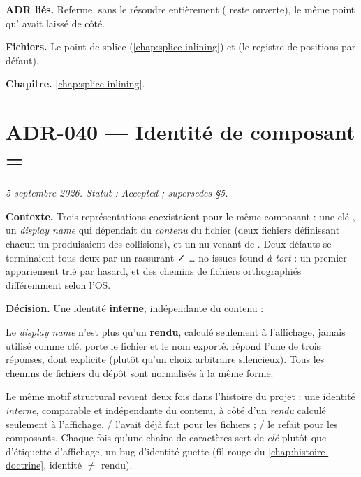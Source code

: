 \textbf{ADR liés.} Referme, sans le résoudre entièrement ( reste
ouverte), le même point qu' avait laissé de côté.

\textbf{Fichiers.} Le point de splice (\cref{chap:splice-inlining}) et
 (le registre de positions par défaut).

\textbf{Chapitre.} \cref{chap:splice-inlining}.

\section{ADR-040 --- Identité de composant = }
\label{adr:40}
\noindent\textit{5 septembre 2026. Statut : Accepted ; supersedes  §5.}

\textbf{Contexte.} Trois représentations coexistaient pour \og le même\fg{}
composant : une clé , un \emph{display name} qui
dépendait du \emph{contenu} du fichier (deux fichiers définissant chacun un
 produisaient des collisions), et un  nu venant de
. Deux défauts se terminaient tous deux par un rassurant
\og ✓ … no issues found\fg{} \emph{à tort} : un premier appariement trié par
hasard, et des chemins de fichiers orthographiés différemment selon l'OS.

\textbf{Décision.} Une identité \textbf{interne}, indépendante du contenu :


Le \emph{display name} n'est plus qu'un \textbf{rendu}, calculé seulement à
l'affichage, jamais utilisé comme clé.  porte le fichier
et le nom exporté.  répond l'une de trois réponses, dont
 explicite (plutôt qu'un choix arbitraire silencieux). Tous
les chemins de fichiers du dépôt sont normalisés à la même forme.

\begin{piege}
Le même motif structural revient deux fois dans l'histoire du projet : une
identité \emph{interne}, comparable et indépendante du contenu, à côté d'un
\emph{rendu} calculé seulement à l'affichage. / l'avait
déjà fait pour les fichiers ; / le refait pour les
composants. Chaque fois qu'une chaîne de caractères sert de \emph{clé} plutôt
que d'étiquette d'affichage, un bug d'identité guette (fil rouge du
\cref{chap:histoire-doctrine}, \og identité $\ne$ rendu\fg{}).
\end{piege}

